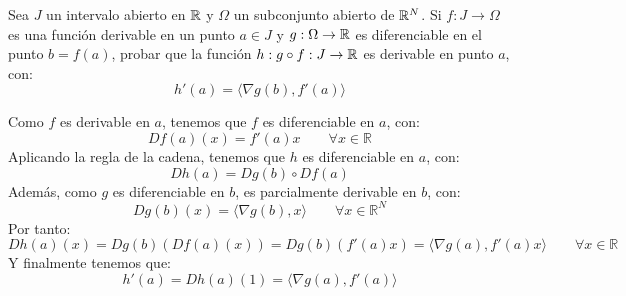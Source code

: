 \begin{ejercicio}
    Sea $J$ un intervalo abierto en $\mathbb{R}$ y $\Omega$ un subconjunto abierto de $\mathbb{R}^N$. Si $f:J\to \Omega$ es una función derivable en un punto $a\in J$ y $g:\Omega\to \mathbb{R}$ es diferenciable en el punto $b=f(a)$, probar que la función $h:g\circ f:J\to \mathbb{R}$ es derivable en punto $a$, con:
    \begin{equation*}
        h'(a) = \langle \nabla g(b), f'(a) \rangle 
    \end{equation*}

    \noindent
    Como $f$ es derivable en $a$, tenemos que $f$ es diferenciable en $a$, con:
    \begin{equation*}
        Df(a)(x) = f'(a)x \qquad \forall x\in \mathbb{R}
    \end{equation*}
    Aplicando la regla de la cadena, tenemos que $h$ es diferenciable en $a$, con:
    \begin{equation*}
        Dh(a) = Dg(b)\circ Df(a) 
    \end{equation*}
    Además, como $g$ es diferenciable en $b$, es parcialmente derivable en $b$, con:
    \begin{equation*}
        Dg(b)(x) = \langle \nabla g(b), x \rangle  \qquad \forall x\in \mathbb{R}^N
    \end{equation*}
    Por tanto:
    \begin{equation*}
        Dh(a)(x) = Dg(b)(Df(a)(x)) = Dg(b)(f'(a)x) = \langle \nabla g(a), f'(a)x \rangle  \qquad \forall x\in \mathbb{R}
    \end{equation*}
    Y finalmente tenemos que:
    \begin{equation*}
        h'(a) = Dh(a)(1) = \langle \nabla g(a), f'(a) \rangle 
    \end{equation*}
\end{ejercicio}

